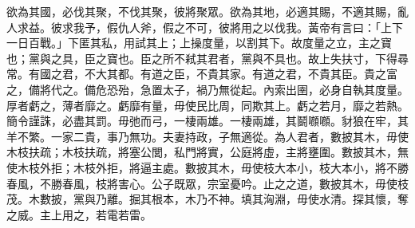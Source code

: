\begin{pinyinscope}
欲為其國，必伐其聚，不伐其聚，彼將聚眾。欲為其地，必適其賜，不適其賜，亂人求益。彼求我予，假仇人斧，假之不可，彼將用之以伐我。黃帝有言曰：「上下一日百戰。」下匿其私，用試其上；上操度量，以割其下。故度量之立，主之寶也；黨與之具，臣之寶也。臣之所不弒其君者，黨與不具也。故上失扶寸，下得尋常。有國之君，不大其都。有道之臣，不貴其家。有道之君，不貴其臣。貴之富之，備將代之。備危恐殆，急置太子，禍乃無從起。內索出圉，必身自執其度量。厚者虧之，薄者靡之。虧靡有量，毋使民比周，同欺其上。虧之若月，靡之若熱。簡令謹誅，必盡其罰。毋弛而弓，一棲兩雄。一棲兩雄，其鬬㘖㘖。豺狼在牢，其羊不繁。一家二貴，事乃無功。夫妻持政，子無適從。為人君者，數披其木，毋使木枝扶疏；木枝扶疏，將塞公閭，私門將實，公庭將虛，主將壅圍。數披其木，無使木枝外拒；木枝外拒，將逼主處。數披其木，毋使枝大本小，枝大本小，將不勝春風，不勝春風，枝將害心。公子既眾，宗室憂吟。止之之道，數披其木，毋使枝茂。木數披，黨與乃離。掘其根本，木乃不神。填其洶淵，毋使水清。探其懷，奪之威。主上用之，若電若雷。


\end{pinyinscope}